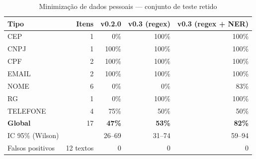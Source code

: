 \begin{table}[htbp]
\caption{Minimização de dados pessoais --- conjunto de teste retido}\label{tab:minimizacao_teste}
\centering\small
\setlength{\tabcolsep}{4pt}
\begin{tabular}{lrrrr}
\toprule
Tipo & Itens & v0.2.0 & v0.3 (regex) & v0.3 (regex + NER) \\
\midrule
CEP & 1 & 0\% & 100\% & 100\% \\
CNPJ & 1 & 100\% & 100\% & 100\% \\
CPF & 2 & 100\% & 100\% & 100\% \\
EMAIL & 2 & 100\% & 100\% & 100\% \\
NOME & 6 & 0\% & 0\% & 83\% \\
RG & 1 & 0\% & 100\% & 100\% \\
TELEFONE & 4 & 75\% & 50\% & 50\% \\
\textbf{Global} & 17 & \textbf{47\%} & \textbf{53\%} & \textbf{82\%} \\
IC 95\% (Wilson) &  & 26--69 & 31--74 & 59--94 \\
Falsos positivos & 12 textos & 0 & 0 & 0 \\
\bottomrule
\end{tabular}
\end{table}
